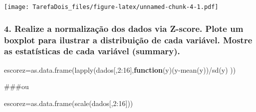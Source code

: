 \documentclass[
]{article}
\newenvironment{Shaded}{\begin{snugshade}}{\end{snugshade}}
\newcommand{\AttributeTok}[1]{\textcolor[rgb]{0.77,0.63,0.00}{#1}}
\newcommand{\ControlFlowTok}[1]{\textcolor[rgb]{0.13,0.29,0.53}{\textbf{#1}}}
\newcommand{\DecValTok}[1]{\textcolor[rgb]{0.00,0.00,0.81}{#1}}
\newcommand{\FunctionTok}[1]{\textcolor[rgb]{0.00,0.00,0.00}{#1}}
\newcommand{\NormalTok}[1]{#1}
\newcommand{\OtherTok}[1]{\textcolor[rgb]{0.56,0.35,0.01}{#1}}
\newcommand{\SpecialCharTok}[1]{\textcolor[rgb]{0.00,0.00,0.00}{#1}}
\newcommand{\StringTok}[1]{\textcolor[rgb]{0.31,0.60,0.02}{#1}}
\begin{document}
\begin{Shaded}
\end{Shaded}

\texttt{[image: TarefaDois\_files/figure-latex/unnamed-chunk-4-1.pdf]}

\hypertarget{realize-a-normalizauxe7uxe3o-dos-dados-via-z-score.-plote-um-boxplot-para-ilustrar-a-distribuiuxe7uxe3o-de-cada-variuxe1vel.-mostre-as-estatuxedsticas-de-cada-variuxe1vel-summary.}{%
\subsubsection{4. Realize a normalização dos dados via Z-score. Plote um
boxplot para ilustrar a distribuição de cada variável. Mostre as
estatísticas de cada variável
(summary).}\label{realize-a-normalizauxe7uxe3o-dos-dados-via-z-score.-plote-um-boxplot-para-ilustrar-a-distribuiuxe7uxe3o-de-cada-variuxe1vel.-mostre-as-estatuxedsticas-de-cada-variuxe1vel-summary.}}

\begin{Shaded}
\begin{Highlighting}[]
\NormalTok{escorez}\OtherTok{=}\FunctionTok{as.data.frame}\NormalTok{(}\FunctionTok{lapply}\NormalTok{(dados[,}\DecValTok{2}\SpecialCharTok{:}\DecValTok{16}\NormalTok{],}\ControlFlowTok{function}\NormalTok{(y)(y}\SpecialCharTok{{-}}\FunctionTok{mean}\NormalTok{(y))}\SpecialCharTok{/}\FunctionTok{sd}\NormalTok{(y) ))}
\end{Highlighting}
\end{Shaded}

\#\#\#ou

\begin{Shaded}
\begin{Highlighting}[]
\NormalTok{escorez}\OtherTok{=}\FunctionTok{as.data.frame}\NormalTok{(}\FunctionTok{scale}\NormalTok{(dados[,}\DecValTok{2}\SpecialCharTok{:}\DecValTok{16}\NormalTok{]))}
\end{Highlighting}
\end{Shaded}
\end{document}
